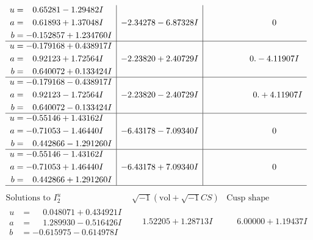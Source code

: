 \documentclass[1p]{elsarticle_modified}
\theoremstyle{definition}
\newcommand{\I}{\sqrt{-1}}
\begin{document}
$$\begin{array}{c|c|c}
\begin{aligned}
u &= \phantom{-}0.65281 - 1.29482 I \\
a &= \phantom{-}0.61893 + 1.37048 I \\
b &= -0.152857 + 1.234760 I\end{aligned}
 & -2.34278 - 6.87328 I & \phantom{-0.000000 } 0 \\ \hline\begin{aligned}
u &= -0.179168 + 0.438917 I \\
a &= \phantom{-}0.92123 + 1.72564 I \\
b &= \phantom{-}0.640072 + 0.133424 I\end{aligned}
 & -2.23820 + 2.40729 I & \phantom{-0.000000 } 0. - 4.11907 I \\ \hline\begin{aligned}
u &= -0.179168 - 0.438917 I \\
a &= \phantom{-}0.92123 - 1.72564 I \\
b &= \phantom{-}0.640072 - 0.133424 I\end{aligned}
 & -2.23820 - 2.40729 I & \phantom{-0.000000 -}0. + 4.11907 I \\ \hline\begin{aligned}
u &= -0.55146 + 1.43162 I \\
a &= -0.71053 - 1.46440 I \\
b &= \phantom{-}0.442866 - 1.291260 I\end{aligned}
 & -6.43178 - 7.09340 I & \phantom{-0.000000 } 0 \\ \hline\begin{aligned}
u &= -0.55146 - 1.43162 I \\
a &= -0.71053 + 1.46440 I \\
b &= \phantom{-}0.442866 + 1.291260 I\end{aligned}
 & -6.43178 + 7.09340 I & \phantom{-0.000000 } 0\\
 \hline 
 \end{array}$$\newpage$$\begin{array}{c|c|c}  
\text{Solutions to }I^u_{2}& \I (\text{vol} + \sqrt{-1}CS) & \text{Cusp shape}\\
 \hline 
\begin{aligned}
u &= \phantom{-}0.048071 + 0.434921 I \\
a &= \phantom{-}1.289930 - 0.516426 I \\
b &= -0.615975 - 0.614978 I\end{aligned}
 & \phantom{-}1.52205 + 1.28713 I & \phantom{-}6.00000 + 1.19437 I \\ \hline\begin{aligned}

\end{aligned}
\end{array}$$
\end{document}
